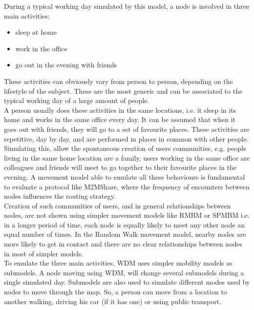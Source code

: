 During a typical working day simulated by this model, a node is involved in three main activities:
\begin{itemize}
\item sleep at home
\item work in the office
\item go out in the evening with friends
\end{itemize}
These activities can obviously vary from person to person, depending on the lifestyle of the subject. These are the most generic and can be associated to the typical working day of a large amount of people.
\\

A person usually does these activities in the same locations, i.e. it sleep in its home and works in the same office every day. It can be assumed that when it goes out with friends, they will go to a set of favourite places. These activities are repetitive, day by day, and are performed in places in common with other people. Simulating this, allow the spontaneous creation of users communities, e.g. people living in the same home location are a family, users working in the same office are colleagues and friends will meet to go together to their favourite places in the evening. A movement model able to emulate all these behaviours is fundamental to evaluate a protocol like M2MShare, where the frequency of encounters between nodes influences the routing strategy.\\

Creation of such communities of users, and in general relationships between nodes, are not shown using simpler movement models like RMBM or SPMBM i.e. in a longer period of time, each node is equally likely to meet any other node an equal number of times. In the Random Walk movement model, nearby nodes are more likely to get in contact and there are no clear relationships between nodes in most of simpler models.
\\

To emulate the three main activities, WDM uses simpler mobility models as submodels. A node moving using WDM, will change several submodels during a single simulated day. Submodels are also used to simulate different modes used by nodes to move through the map. So, a person can move from a location to another walking, driving his car (if it has one) or using public transport.
\\


